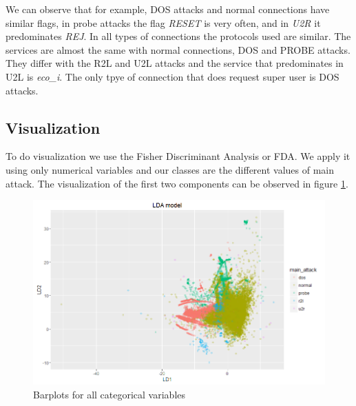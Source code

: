 \documentclass[a4paper]{article} %
\begin{document}
We can observe that for example, DOS attacks and normal connections have similar flags, in probe attacks the flag \textit{RESET} is very often, and in \textit{U2R} it predominates \textit{REJ}. In all types of connections the protocols used are similar. The services are almost the same with normal connections, DOS and PROBE attacks. They differ with the R2L and U2L attacks and the service that predominates in U2L is \textit{eco\_i}. The only tpye of connection that does request super user is DOS attacks.
\subsection{Visualization}
To do visualization we use the Fisher Discriminant Analysis or FDA. We apply it using only numerical variables and our classes are the different values of main attack. The visualization of the first two components can be observed in figure \ref{fig:fda}.

\begin{figure}[H]
	\centering
	\includegraphics[scale=0.45]{LDA.png}
	\caption{Barplots for all categorical variables}
	\label{fig:fda}
\end{figure}
\end{document}
